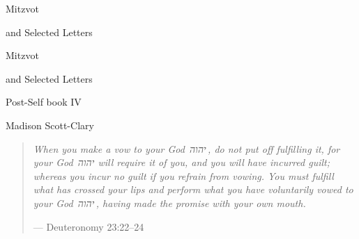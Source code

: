 \documentclass[11pt]{memoir}
\begin{document}
  \frontmatter

  \thispagestyle{empty}
  \null
  \vfill
  \begin{flushright}
    \DisplayFont Mitzvot
    
    \vspace{1ex}

    {\footnotesize and Selected Letters}
  \end{flushright}
  \vfill
  \cleardoublepage

  \pagestyle{plain}

  \doublespacing

  \begin{flushright}
    \null
    \vfill
    {\Huge\DisplayFont Mitzvot}

    \vspace{1ex}

    {\Large\DisplayFont and Selected Letters}

    {\DisplayFont Post-Self book IV}

    \vfill

    {\Large\DisplayFont Madison Scott-Clary}
  \end{flushright}
  \thispagestyle{empty}

  \newpage

  

  \tableofcontents*
  \newpage
  \null
  \cleardoublepage



  \mainmatter

  \pagestyle{ourbook}

  \cleardoublepage
  \null
  \thispagestyle{empty}
  \vfill
  \begin{quote}
    \small
    \emph{When you make a vow to your God~{\HebFont יהוה}\,, do not put off fulfilling it, for your God~{\HebFont יהוה} will require it of you, and you will have incurred guilt; whereas you incur no guilt if you refrain from vowing. You must fulfill what has crossed your lips and perform what you have voluntarily vowed to your God~{\HebFont יהוה}\,, having made the promise with your own mouth.}

    --- Deuteronomy 23:22--24
  \end{quote}
  \vfill
\end{document}
